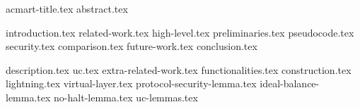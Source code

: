 \documentclass[sigconf]{acmart}
\begin{document}
\pagestyle{plain}
{acmart-title.tex}
{abstract.tex}
\maketitle


{introduction.tex}
{related-work.tex}
{high-level.tex}
{preliminaries.tex}
{pseudocode.tex}
{security.tex}
{comparison.tex}
{future-work.tex}
{conclusion.tex}

\makeatletter%
%
  {\appendices}%
  {\appendix}%
\makeatother%
{description.tex}
{uc.tex}
{extra-related-work.tex}
{functionalities.tex}
{construction.tex}
{lightning.tex}
{virtual-layer.tex}
{protocol-security-lemma.tex}
{ideal-balance-lemma.tex}
{no-halt-lemma.tex}
{uc-lemmas.tex}
\end{document}
